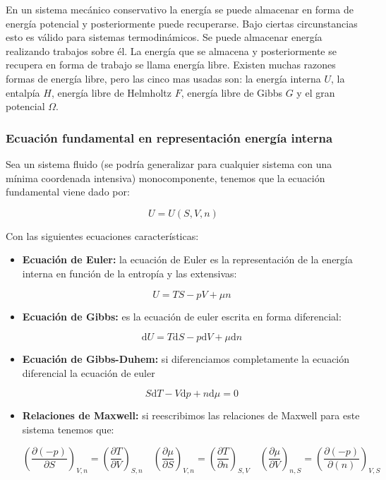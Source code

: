 \documentclass[12pt,a4paper]{article}
\newcommand{\D}{\mathrm{d}}
\newcommand{\parentesis}[1]{\left( #1 \right)}
\newcommand{\parciales}[2]{\frac{\partial #1}{\partial #2}}
\begin{document}
En un sistema mecánico conservativo la energía se puede almacenar en forma de energía potencial y posteriormente puede recuperarse. Bajo ciertas circunstancias esto es válido para sistemas termodinámicos. Se puede almacenar energía realizando trabajos sobre él. La energía que se almacena y posteriormente se recupera en forma de trabajo se llama energía libre. Existen muchas razones formas de energía libre, pero las cinco mas usadas son: la energía interna $U$, la entalpía $H$, energía libre de Helmholtz $F$, energía libre de Gibbs $G$ y el gran potencial $\Omega$. \\

\subsubsection{Ecuación fundamental en representación energía interna}

Sea un sistema fluido (se podría generalizar para cualquier sistema con una mínima coordenada intensiva) monocomponente, tenemos que la ecuación fundamental viene dado por:

\begin{equation}
U = U(S,V,n)
\end{equation}

Con las siguientes ecuaciones características:

\begin{itemize}
\item \textbf{Ecuación de Euler:} la ecuación de Euler es la representación de la energía interna en función de la entropía y las extensivas:

\begin{equation}
U = T S - p V+ \mu n
\end{equation}

\item \textbf{Ecuación de Gibbs:} es la ecuación de euler escrita en forma diferencial:

\begin{equation}
\D U = T \D S - p \D V + \mu \D n
\end{equation}

\item \textbf{Ecuación de Gibbs-Duhem:} si diferenciamos completamente la ecuación diferencial la ecuación de euler

\begin{equation}
S \D T - V \D p + n \D \mu = 0
\end{equation}

\item \textbf{Relaciones de Maxwell:} si reescribimos las relaciones de Maxwell para este sistema tenemos que:

\begin{equation}
\parentesis{\parciales{(-p)}{S}}_{V,n}  = \parentesis{\parciales{T}{V}}_{S,n} \quad \parentesis{\parciales{\mu}{S}}_{V,n} = \parentesis{\parciales{T}{n}}_{S,V} \quad \parentesis{\parciales{\mu}{V}}_{n,S} = \parentesis{\parciales{(-p)}{(n)}}_{V,S}
\end{equation}


\end{itemize}
\end{document}
